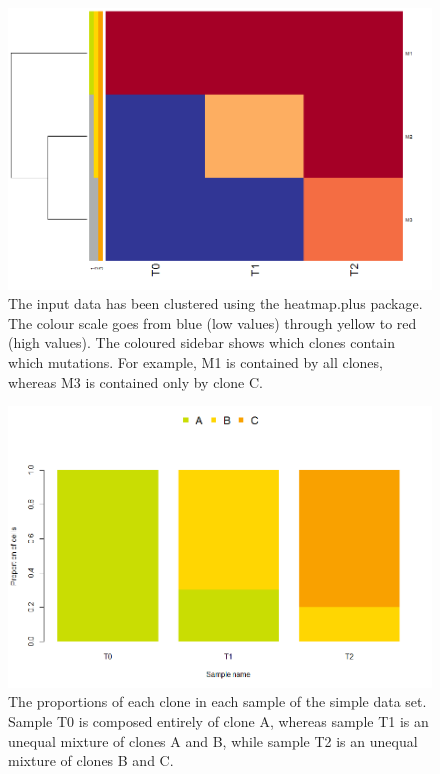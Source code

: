 \documentclass{article}
\begin{document}
\begin{figure}[H]
   \centering
       \includegraphics{gaga_simple_data_heatmap}
   \caption{The input data has been clustered using the heatmap.plus package.  The colour scale goes from blue (low values) through yellow to red (high values).
   The coloured sidebar shows which clones contain which mutations.  For example, M1 is contained by all clones, whereas M3 is contained only by clone C.}
\end{figure}

\begin{figure}[H]
   \centering
       \includegraphics{gaga_simple_data_proportions}
   \caption{The proportions of each clone in each sample of the simple data set.  Sample T0 is composed entirely of clone A, whereas sample T1 is an unequal mixture of 
   clones A and B, while sample T2 is an unequal mixture of clones B and C.}
\end{figure}
\end{document}
